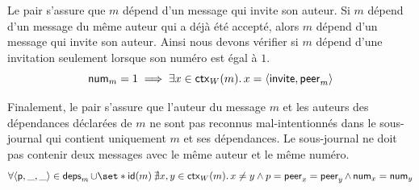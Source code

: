 Le pair s'assure que $m$ dépend d'un message qui invite son auteur.
Si $m$ dépend d'un message du même auteur qui a déjà été accepté, alors $m$ dépend d'un message qui invite son auteur.
Ainsi nous devons vérifier si $m$ dépend d'une invitation seulement lorsque son numéro est égal à $1$.
%
\begin{equation}\label{eq:invit-verif}
    \operatorname{\mathsf{num}}_m = 1 \implies \exists x \in \operatorname{\mathsf{ctx}}_W(m) \ldotp x = \langle\operatorname{\mathsf{invite}}, \operatorname{\mathsf{peer}}_m\rangle
\end{equation}

%

Finalement, le pair s'assure que l'auteur du message $m$ et les auteurs des dépendances déclarées de $m$ ne sont pas reconnus mal-intentionnés dans le sous-journal qui contient uniquement $m$ et ses dépendances.
Le sous-journal ne doit pas contenir deux messages avec le même auteur et le même numéro.
%
%
\begin{equation}\label{eq:honest-verif}
    \forall \tuple*{\trm{p}, \_, \_} \in \trm{deps}_m \cup \set*{\trm{id}(m)} \:\nexists x, y \in \trm{ctx}_W(m) \qsep x \neq y \land p = \trm{peer}_x = \trm{peer}_y \land \trm{num}_x = \trm{num}_y
\end{equation}

